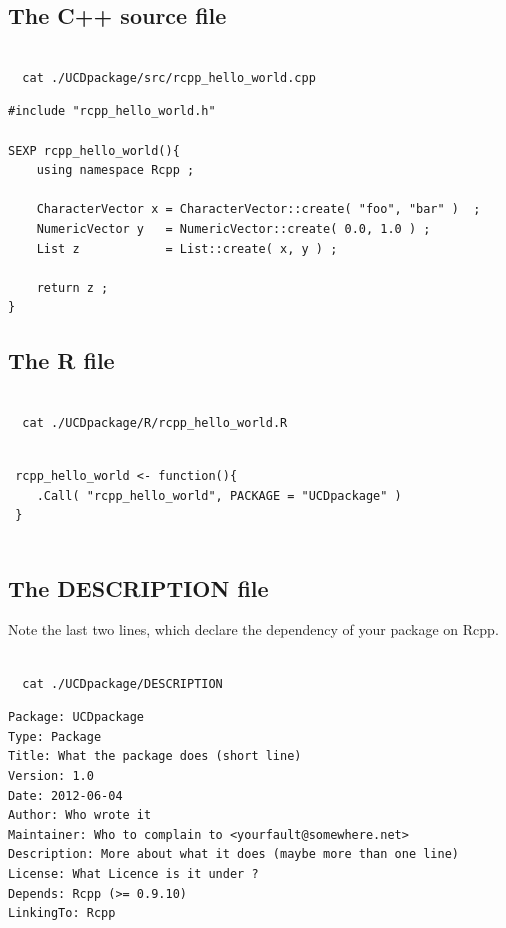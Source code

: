 \documentclass[11pt]{article}
\begin{document}
\subsection{The C++ source file}
\label{sec-8-4}



\begin{verbatim}
  
  cat ./UCDpackage/src/rcpp_hello_world.cpp
\end{verbatim}


\begin{verbatim}
#include "rcpp_hello_world.h"

SEXP rcpp_hello_world(){
    using namespace Rcpp ;
    
    CharacterVector x = CharacterVector::create( "foo", "bar" )  ;
    NumericVector y   = NumericVector::create( 0.0, 1.0 ) ;
    List z            = List::create( x, y ) ;
    
    return z ;
}
\end{verbatim}
\subsection{The R file}
\label{sec-8-5}



\begin{verbatim}
  
  cat ./UCDpackage/R/rcpp_hello_world.R
\end{verbatim}

\begin{verbatim}
 
 rcpp_hello_world <- function(){
 	.Call( "rcpp_hello_world", PACKAGE = "UCDpackage" )
 }
 
\end{verbatim}
\subsection{The DESCRIPTION file}
\label{sec-8-6}


Note the last two lines, which declare the dependency of your package
on Rcpp.


\begin{verbatim}
  
  cat ./UCDpackage/DESCRIPTION
\end{verbatim}


\begin{verbatim}
Package: UCDpackage
Type: Package
Title: What the package does (short line)
Version: 1.0
Date: 2012-06-04
Author: Who wrote it
Maintainer: Who to complain to <yourfault@somewhere.net>
Description: More about what it does (maybe more than one line)
License: What Licence is it under ?
Depends: Rcpp (>= 0.9.10)
LinkingTo: Rcpp
\end{verbatim}
\end{document}
